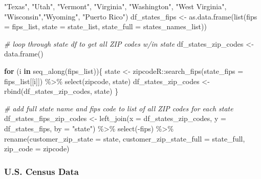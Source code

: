 \documentclass[
  11 pt,
  openany]{book}
\newenvironment{Shaded}{\begin{snugshade}}{\end{snugshade}}
\newcommand{\AttributeTok}[1]{\textcolor[rgb]{0.77,0.63,0.00}{#1}}
\newcommand{\CommentTok}[1]{\textcolor[rgb]{0.56,0.35,0.01}{\textit{#1}}}
\newcommand{\ControlFlowTok}[1]{\textcolor[rgb]{0.13,0.29,0.53}{\textbf{#1}}}
\newcommand{\FunctionTok}[1]{\textcolor[rgb]{0.00,0.00,0.00}{#1}}
\newcommand{\NormalTok}[1]{#1}
\newcommand{\OtherTok}[1]{\textcolor[rgb]{0.56,0.35,0.01}{#1}}
\newcommand{\SpecialCharTok}[1]{\textcolor[rgb]{0.00,0.00,0.00}{#1}}
\newcommand{\StringTok}[1]{\textcolor[rgb]{0.31,0.60,0.02}{#1}}
\begin{document}
\begin{Shaded}
\begin{Highlighting}[]
  \StringTok{"Texas"}\NormalTok{, }\StringTok{"Utah"}\NormalTok{, }\StringTok{"Vermont"}\NormalTok{, }\StringTok{"Virginia"}\NormalTok{, }\StringTok{"Washington"}\NormalTok{, }
  \StringTok{"West Virginia"}\NormalTok{, }\StringTok{"Wisconsin"}\NormalTok{,}\StringTok{"Wyoming"}\NormalTok{, }\StringTok{"Puerto Rico"}\NormalTok{)}
\NormalTok{df\_states\_fips }\OtherTok{\textless{}{-}} \FunctionTok{as.data.frame}\NormalTok{(}\FunctionTok{list}\NormalTok{(}\AttributeTok{fips =}\NormalTok{ fips\_list,}
                                     \AttributeTok{state =}\NormalTok{ state\_list,}
                                     \AttributeTok{state\_full =}\NormalTok{ states\_names\_list))}

\CommentTok{\# loop through state df to get all ZIP codes w/in state}
\NormalTok{df\_states\_zip\_codes }\OtherTok{\textless{}{-}} \FunctionTok{data.frame}\NormalTok{()}

\ControlFlowTok{for}\NormalTok{ (i }\ControlFlowTok{in} \FunctionTok{seq\_along}\NormalTok{(fips\_list))\{}
\NormalTok{  state }\OtherTok{\textless{}{-}}\NormalTok{ zipcodeR}\SpecialCharTok{::}\FunctionTok{search\_fips}\NormalTok{(}\AttributeTok{state\_fips =}\NormalTok{ fips\_list[[i]]) }\SpecialCharTok{\%\textgreater{}\%} 
    \FunctionTok{select}\NormalTok{(zipcode, state)}
\NormalTok{  df\_states\_zip\_codes }\OtherTok{\textless{}{-}} \FunctionTok{rbind}\NormalTok{(df\_states\_zip\_codes, state)}
\NormalTok{\}}

\CommentTok{\# add full state name and fips code to list of all ZIP codes for each state}
\NormalTok{df\_states\_fips\_zip\_codes }\OtherTok{\textless{}{-}} 
  \FunctionTok{left\_join}\NormalTok{(}\AttributeTok{x =}\NormalTok{ df\_states\_zip\_codes,}
            \AttributeTok{y =}\NormalTok{ df\_states\_fips,}
            \AttributeTok{by =} \StringTok{"state"}\NormalTok{) }\SpecialCharTok{\%\textgreater{}\%} 
  \FunctionTok{select}\NormalTok{(}\SpecialCharTok{{-}}\NormalTok{fips) }\SpecialCharTok{\%\textgreater{}\%} 
  \FunctionTok{rename}\NormalTok{(}\AttributeTok{customer\_zip\_state =}\NormalTok{ state,}
         \AttributeTok{customer\_zip\_state\_full =}\NormalTok{ state\_full,}
         \AttributeTok{zip\_code =}\NormalTok{ zipcode)}
\end{Highlighting}
\end{Shaded}

\hypertarget{u.s.-census-data}{%
\subsubsection{U.S. Census Data}\label{u.s.-census-data}}
\end{document}
